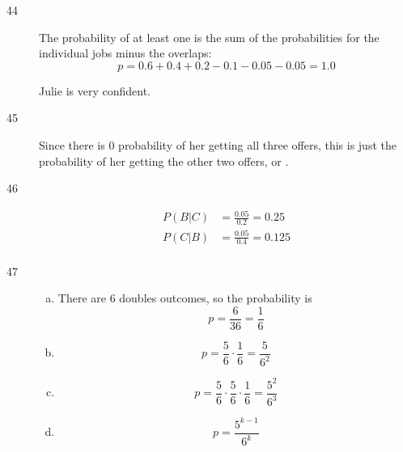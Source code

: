\documentclass[letterpaper, landscape]{exam}
\begin{document}
\begin{description}


    \item[44]
      The probability of at least one is the sum of the probabilities for the individual
      jobs minus the overlaps:
        \[
          p = 0.6 + 0.4 + 0.2 - 0.1 - 0.05 - 0.05 = \boxed{ 1.0 }
        \]

        Julie is very confident.

    \item[45]
      Since there is 0 probability of her getting all three offers, this is just the
      probability of her getting the other two offers, or .

    \item[46]
      \begin{align*}
        P(B|C) &= \frac{0.05}{0.2} = \boxed{ 0.25 } \\
        P(C|B) &= \frac{0.05}{0.4} = \boxed{ 0.125 } \\
      \end{align*}

    \item[47]
      \begin{enumerate}[(a)]
        \item There are 6 doubles outcomes, so the probability is
          \[
            p = \frac{6}{36} = \boxed{ \frac{1}{6} }
          \]

        \item 
          \[
            p = \frac{5}{6} \cdot \frac{1}{6} = \boxed{ \frac{5}{6^2} }
          \]

        \item 
          \[
            p = \frac{5}{6} \cdot \frac{5}{6} \cdot \frac{1}{6} 
              = \boxed{ \frac{5^2}{6^3} }
          \]

        \item
          \[
            p = \frac{5^{k - 1}}{6^k}
          \]

      \end{enumerate}


\end{description}
\end{document}
